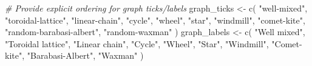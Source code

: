 \documentclass[
]{book}
\newenvironment{Shaded}{\begin{snugshade}}{\end{snugshade}}
\newcommand{\CommentTok}[1]{\textcolor[rgb]{0.56,0.35,0.01}{\textit{#1}}}
\newcommand{\FunctionTok}[1]{\textcolor[rgb]{0.00,0.00,0.00}{#1}}
\newcommand{\NormalTok}[1]{#1}
\newcommand{\OtherTok}[1]{\textcolor[rgb]{0.56,0.35,0.01}{#1}}
\newcommand{\StringTok}[1]{\textcolor[rgb]{0.31,0.60,0.02}{#1}}
\begin{document}
\begin{Shaded}
\begin{Highlighting}[]
\CommentTok{\# Provide explicit ordering for graph ticks/labels}
\NormalTok{graph\_ticks }\OtherTok{\textless{}{-}} \FunctionTok{c}\NormalTok{(}
  \StringTok{"well{-}mixed"}\NormalTok{,}
  \StringTok{"toroidal{-}lattice"}\NormalTok{,}
  \StringTok{"linear{-}chain"}\NormalTok{,}
  \StringTok{"cycle"}\NormalTok{,}
  \StringTok{"wheel"}\NormalTok{,}
  \StringTok{"star"}\NormalTok{,}
  \StringTok{"windmill"}\NormalTok{,}
  \StringTok{"comet{-}kite"}\NormalTok{,}
  \StringTok{"random{-}barabasi{-}albert"}\NormalTok{,}
  \StringTok{"random{-}waxman"}
\NormalTok{)}
\NormalTok{graph\_labels }\OtherTok{\textless{}{-}} \FunctionTok{c}\NormalTok{(}
  \StringTok{"Well mixed"}\NormalTok{,}
  \StringTok{"Toroidal lattice"}\NormalTok{,}
  \StringTok{"Linear chain"}\NormalTok{,}
  \StringTok{"Cycle"}\NormalTok{,}
  \StringTok{"Wheel"}\NormalTok{,}
  \StringTok{"Star"}\NormalTok{,}
  \StringTok{"Windmill"}\NormalTok{,}
  \StringTok{"Comet{-}kite"}\NormalTok{,}
  \StringTok{"Barabasi{-}Albert"}\NormalTok{,}
  \StringTok{"Waxman"}
\NormalTok{)}


\end{Highlighting}
\end{Shaded}
\end{document}
